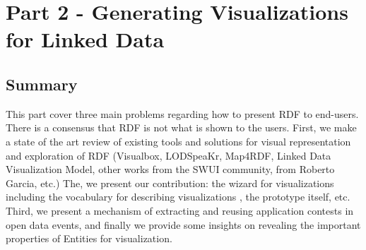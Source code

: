 \chapter*{Part 2 - Generating Visualizations for Linked Data}
\label{part:part2}
 \vspace{10mm}
\section*{Summary}
This part cover three main problems regarding how to present RDF to end-users. There is a consensus that RDF is not what is shown to the users.  First, we make a state of the art review of existing tools and solutions for visual representation and exploration of RDF (Visualbox, LODSpeaKr, Map4RDF, Linked Data Visualization Model, other works from the SWUI community, from Roberto Garcia, etc.) The, we present our contribution: the wizard for visualizations including the vocabulary for describing visualizations , the prototype itself, etc. Third, we present a  mechanism of extracting and reusing application contests in open data events, and finally we provide some insights on revealing the important properties of Entities for visualization. 